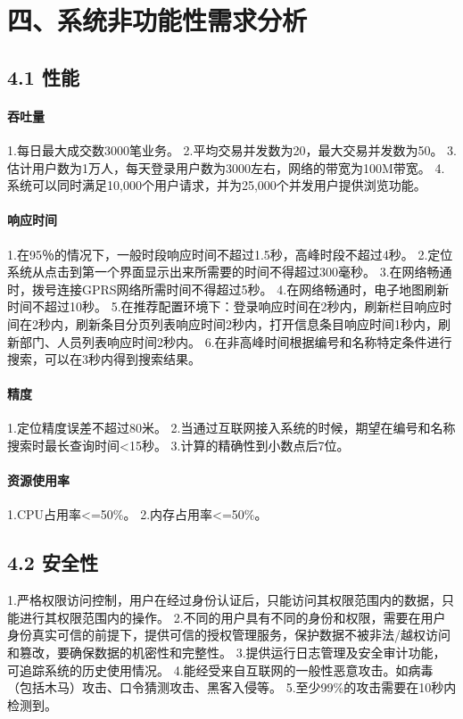\section{四、系统非功能性需求分析}
\subsection{4.1 性能}
\paragraph{吞吐量}
1.每日最大成交数3000笔业务。
2.平均交易并发数为20，最大交易并发数为50。
3.估计用户数为1万人，每天登录用户数为3000左右，网络的带宽为100M带宽。
4.系统可以同时满足10,000个用户请求，并为25,000个并发用户提供浏览功能。
\paragraph{响应时间}
1.在95％的情况下，一般时段响应时间不超过1.5秒，高峰时段不超过4秒。
2.定位系统从点击到第一个界面显示出来所需要的时间不得超过300毫秒。
3.在网络畅通时，拨号连接GPRS网络所需时间不得超过5秒。
4.在网络畅通时，电子地图刷新时间不超过10秒。
5.在推荐配置环境下：登录响应时间在2秒内，刷新栏目响应时间在2秒内，刷新条目分页列表响应时间2秒内，打开信息条目响应时间1秒内，刷新部门、人员列表响应时间2秒内。
6.在非高峰时间根据编号和名称特定条件进行搜索，可以在3秒内得到搜索结果。
\paragraph{精度}
1.定位精度误差不超过80米。
2.当通过互联网接入系统的时候，期望在编号和名称搜索时最长查询时间<15秒。
3.计算的精确性到小数点后7位。
\paragraph{资源使用率}
1.CPU占用率<=50\%。
2.内存占用率<=50\%。

\subsection{4.2 安全性}
1.严格权限访问控制，用户在经过身份认证后，只能访问其权限范围内的数据，只能进行其权限范围内的操作。
2.不同的用户具有不同的身份和权限，需要在用户身份真实可信的前提下，提供可信的授权管理服务，保护数据不被非法/越权访问和篡改，要确保数据的机密性和完整性。
3.提供运行日志管理及安全审计功能，可追踪系统的历史使用情况。
4.能经受来自互联网的一般性恶意攻击。如病毒（包括木马）攻击、口令猜测攻击、黑客入侵等。
5.至少99\%的攻击需要在10秒内检测到。

